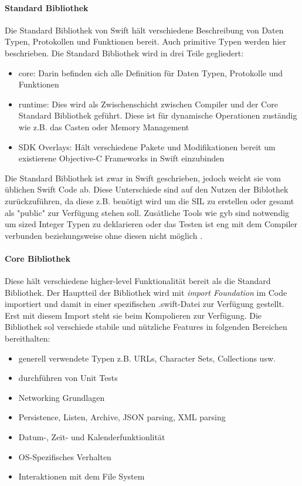 \paragraph{Standard Bibliothek}
\label{para:standardbibliothek}
Die Standard Bibliothek von Swift hält verschiedene Beschreibung von Daten Typen, Protokollen und Funktionen bereit. Auch primitive Typen werden hier beschrieben. Die Standard Bibliothek wird in drei Teile gegliedert:
\begin{itemize}
\item core: Darin befinden sich alle Definition für Daten Typen, Protokolle und Funktionen
\item runtime: Dies wird als Zwischenschicht zwischen Compiler und der Core Standard Bibliothek geführt. Diese ist für dynamische Operationen zuständig wie z.B. das Casten oder Memory Management
\item SDK Overlays: Hält verschiedene Pakete und Modifikationen bereit um existierene Objective-C Frameworks in Swift einzubinden
\end{itemize}

Die Standard Bibliothek ist zwar in Swift geschrieben, jedoch weicht sie vom üblichen Swift Code ab. Diese Unterschiede sind auf den Nutzen der Biblothek zurückzuführen, da diese z.B. benötigt wird um die SIL zu erstellen oder gesamt als "public" zur Verfügung stehen soll. Zusätliche Tools wie gyb sind notwendig um sized Integer Typen zu deklarieren oder das Testen ist eng mit dem Compiler verbunden beziehungsweise ohne diesen nicht möglich \parencite{swiftbibliothek}.

\paragraph{Core Bibliothek}
Diese hält verschiedene higher-level Funktionalität bereit als die Standard Bibliothek. Der Hauptteil der Bibliothek wird mit \textit{import Foundation} im Code importiert und damit in einer spezifischen .swift-Datei zur Verfügung gestellt. Erst mit diesem Import steht sie beim Kompolieren zur Verfügung. Die Bibliothek sol verschiede stabile und nützliche Features in folgenden Bereichen bereithalten:
\begin{itemize}
\item generell verwendete Typen z.B. URLs, Character Sets, Collections usw. 
\item durchführen von Unit Tests
\item Networking Grundlagen
\item Persistence, Listen, Archive, JSON parsing, XML parsing
\item Datum-, Zeit- und Kalenderfunktionlität
\item OS-Spezifisches Verhalten
\item Interaktionen mit dem File System
\end{itemize}

